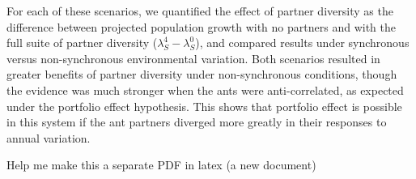 \documentclass[11pt]{article}
\begin{document}
	
	For each of these scenarios, we quantified the effect of partner diversity as the difference between projected population growth with no partners and with the full suite of partner diversity ($\lambda_S^4 - \lambda_S^0$), and compared results under synchronous versus non-synchronous environmental variation. 
	Both scenarios resulted in greater benefits of partner diversity under non-synchronous conditions, though the evidence was much stronger when the ants were anti-correlated, as expected under the portfolio effect hypothesis. 
	This shows that portfolio effect is possible in this system if the ant partners diverged more greatly in their responses to annual variation.
	
	
	\begin{figure}
		\caption{
		}
		\label{app:portfolio}
	\end{figure} Help me make this a separate PDF in latex (a new document)
	
\end{document}
